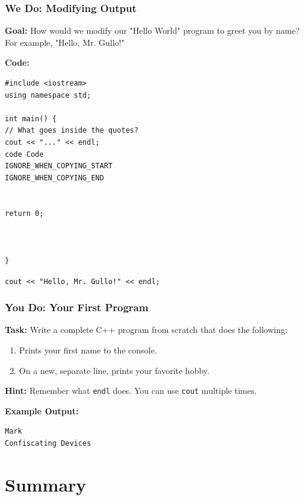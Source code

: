 \documentclass{beamer}
\begin{document}
\begin{frame}[fragile]
\frametitle{We Do: Modifying Output}
\textbf{Goal:} How would we modify our "Hello World" program to greet you by name? For example, "Hello, Mr. Gullo!"

\pause

\textbf{Code:}
\begin{lstlisting}
#include <iostream>
using namespace std;

int main() {
// What goes inside the quotes?
cout << "..." << endl;
code Code
IGNORE_WHEN_COPYING_START
IGNORE_WHEN_COPYING_END

    
return 0;

  

}
\end{lstlisting}
\pause
\vspace{1cm}
\begin{center}
\huge
\alert{\texttt{cout << "Hello, Mr. Gullo!" << endl;}}
\end{center}

\end{frame}

\begin{frame}[fragile]
\frametitle{You Do: Your First Program}
\textbf{Task:} Write a complete C++ program from scratch that does the following:
\begin{enumerate}
\item Prints your first name to the console.
\item On a \alert{new, separate line}, prints your favorite hobby.
\end{enumerate}

\pause

\textbf{Hint:} Remember what \texttt{endl} does. You can use \texttt{cout} multiple times.

\vfill
\textbf{Example Output:}
\begin{verbatim}
Mark
Confiscating Devices
\end{verbatim}
\end{frame}

\section{Summary}
\end{document}
